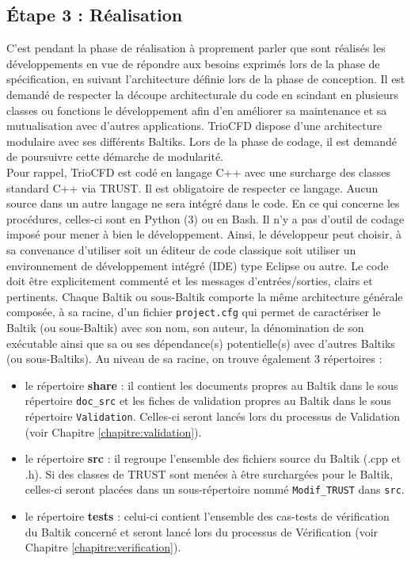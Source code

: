 \subsection{Étape 3 : R\'ealisation}
C'est pendant la phase de réalisation à proprement parler que sont réalisés les développements en vue de répondre aux besoins exprimés lors de la phase de spécification, en suivant l'architecture définie lors de la phase de conception. Il est demandé de respecter la découpe architecturale du code en scindant en plusieurs classes ou fonctions le développement afin d'en améliorer sa maintenance et sa mutualisation avec d'autres applications. TrioCFD dispose d'une architecture modulaire avec ses différents Baltiks. Lors de la phase de codage, il est demandé de poursuivre cette démarche de modularité.\\

Pour rappel, TrioCFD est codé en langage C++ avec une surcharge des classes standard C++ via TRUST. Il est obligatoire de respecter ce langage. Aucun source dans un autre langage ne sera intégré dans le code. En ce qui concerne les procédures, celles-ci sont en Python (3) ou en Bash. Il n'y a pas d'outil de codage imposé pour mener à bien le développement. Ainsi, le développeur peut choisir, à sa convenance d'utiliser soit un éditeur de code classique soit utiliser un environnement de développement intégré (IDE) type Eclipse ou autre. Le code doit être explicitement commenté et les messages d'entrées/sorties, clairs et pertinents. Chaque Baltik ou sous-Baltik comporte la même architecture générale composée, à sa racine, d'un fichier \texttt{project.cfg} qui permet de caractériser le Baltik (ou sous-Baltik) avec son nom, son auteur, la dénomination de son exécutable ainsi que sa ou ses dépendance(s) potentielle(s) avec d'autres Baltiks (ou sous-Baltiks). Au niveau de sa racine, on trouve également 3 répertoires :
\begin{itemize}
   \item le répertoire \textbf{share} : il contient les documents propres au Baltik dans le sous répertoire \texttt{doc\_src} et les fiches de validation propres au Baltik dans le sous répertoire \texttt{Validation}. Celles-ci seront lancés lors du processus de Validation (voir Chapitre \ref{chapitre:validation}).
   \item le répertoire \textbf{src} : il regroupe l'ensemble des fichiers source du Baltik (.cpp et .h). Si des classes de TRUST sont menées à être surchargées pour le Baltik, celles-ci seront placées dans un sous-répertoire nommé \texttt{Modif\_TRUST} dans \texttt{src}.
   \item le répertoire \textbf{tests} : celui-ci contient l'ensemble des cas-tests de vérification du Baltik concerné et seront lancé lors du processus de Vérification (voir Chapitre \ref{chapitre:verification}).
\end{itemize}

